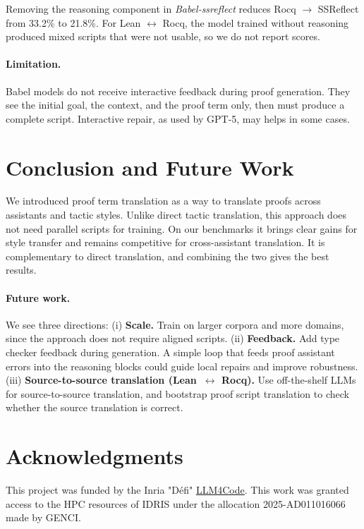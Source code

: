 \documentclass{article}
\begin{document}
Removing the reasoning component in \textit{Babel-ssreflect} reduces Rocq $\to$ SSReflect from 33.2\% to 21.8\%. For Lean $\leftrightarrow$ Rocq, the model trained without reasoning produced mixed scripts that were not usable, so we do not report scores.

\paragraph*{Limitation.}

Babel models do not receive interactive feedback during proof generation. They see the initial goal, the context, and the proof term only, then must produce a complete script. Interactive repair, as used by GPT-5, may helps in some cases.

\section{Conclusion and Future Work}

We introduced proof term translation as a way to translate proofs across assistants and tactic styles. Unlike direct tactic translation, this approach does not need parallel scripts for training. On our benchmarks it brings clear gains for style transfer and remains competitive for cross-assistant translation. It is complementary to direct translation, and combining the two gives the best results.

\paragraph{Future work.}
We see three directions:
%
(i) \textbf{Scale.} Train on larger corpora and more domains, since
the approach does not require aligned scripts.
%
(ii) \textbf{Feedback.} Add type checker feedback during generation. A
simple loop that feeds proof assistant errors into the reasoning
blocks could guide local repairs and improve robustness.
%
(iii) \textbf{Source-to-source translation (Lean~$\leftrightarrow$
  Rocq).} Use off-the-shelf LLMs for source-to-source translation, and
bootstrap proof script translation to check whether the source
translation is correct.

\section{Acknowledgments}

This project was funded by the Inria "Défi" \href{https://project.inria.fr/llm4code/}{LLM4Code}.
This work was granted access to the HPC resources of IDRIS under the allocation 2025-AD011016066 made by GENCI.
\end{document}
